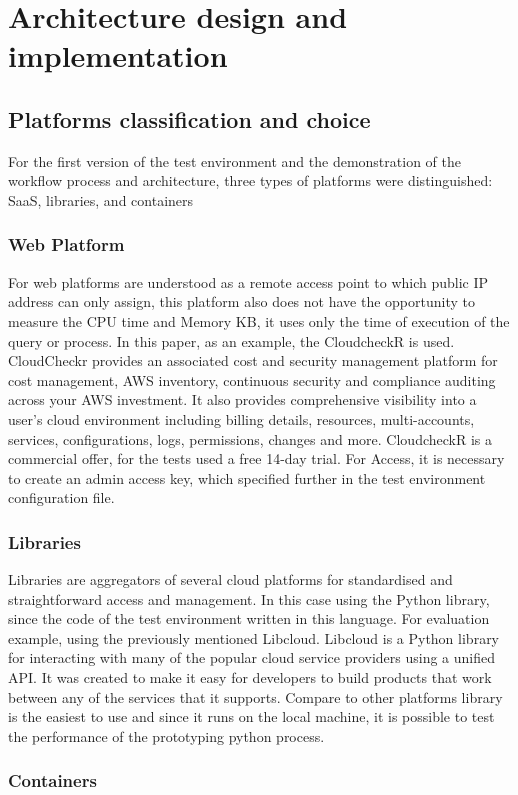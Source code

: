 \section{Architecture design and implementation}
\subsection{Platforms classification and choice}
For the first version of the test environment and the demonstration of the workflow process and architecture, three types of platforms were distinguished: SaaS, libraries, and containers
\subsubsection{Web Platform}
For web platforms are understood as a remote access point to which public IP address can only assign, this platform also does not have the opportunity to measure the CPU time and Memory KB, it uses only the time of execution of the query or process. In this paper, as an example, the CloudcheckR\cite{cloudcheckr} is used. CloudCheckr provides an associated cost and security management platform for cost management, AWS inventory, continuous security and compliance auditing across your AWS investment. It also provides comprehensive visibility into a user's cloud environment including billing details, resources, multi-accounts, services, configurations, logs, permissions, changes and more.  CloudcheckR is a commercial offer,  for the tests used a free 14-day trial. For Access, it is necessary to create an admin access key, which specified further in the test environment configuration file.
\subsubsection{Libraries}
Libraries are aggregators of several cloud platforms for standardised and straightforward access and management. In this case using the Python library, since the code of the test environment written in this language. For evaluation example, using the previously mentioned Libcloud.  Libcloud is a Python library for interacting with many of the popular cloud service providers using a unified API. It was created to make it easy for developers to build products that work between any of the services that it supports. Compare to other platforms library is the easiest to use and since it runs on the local machine, it is possible to test the performance of the prototyping python process.
\subsubsection{Containers}

